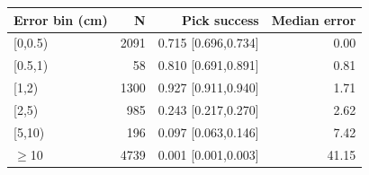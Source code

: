 \begin{tabular}{lrrr}
\hline
Error bin (cm) & N & Pick success & Median error \\
\hline
\mbox{[0,0.5)} & 2091 & 0.715 [0.696,0.734] & 0.00 \\
\mbox{[0.5,1)} & 58 & 0.810 [0.691,0.891] & 0.81 \\
\mbox{[1,2)} & 1300 & 0.927 [0.911,0.940] & 1.71 \\
\mbox{[2,5)} & 985 & 0.243 [0.217,0.270] & 2.62 \\
\mbox{[5,10)} & 196 & 0.097 [0.063,0.146] & 7.42 \\
\mbox{$\geq$10} & 4739 & 0.001 [0.001,0.003] & 41.15 \\
\hline
\end{tabular}
